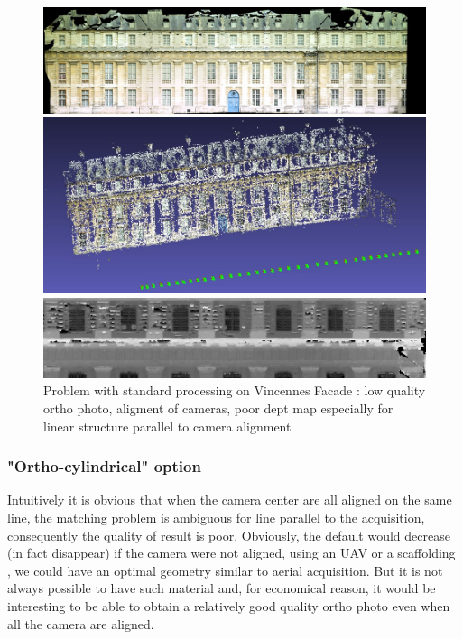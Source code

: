 \begin{figure}
\begin{center}
\includegraphics[width=160mm]{FIGS/Vincennes/Ortho-Moche.jpg}

\vspace{0.3cm}
\includegraphics[width=160mm]{FIGS/Vincennes/CamFace1.jpg}

\vspace{0.3cm}
\includegraphics[width=160mm]{FIGS/Vincennes/MNT-Moche.jpg}

\end{center}
\caption{Problem with standard processing on Vincennes Facade : low quality ortho photo,
aligment of cameras, poor dept map especially for linear structure parallel to camera alignment}
\label{FIG:Pb:Vincenne}
\end{figure}


\subsubsection{"Ortho-cylindrical" option}

Intuitively it  is obvious that when the camera center are all aligned on the same line,
the matching problem is  ambiguous for line parallel to the acquisition, consequently
the quality of result is poor.
Obviously, the default would decrease (in fact disappear) if the camera were not
aligned, using an UAV or a scaffolding , we could have an optimal geometry similar
to aerial acquisition. But it is not always possible to have such material and, for economical reason,
it would be interesting to be able to obtain a relatively good quality ortho photo even when
all the camera are aligned.

